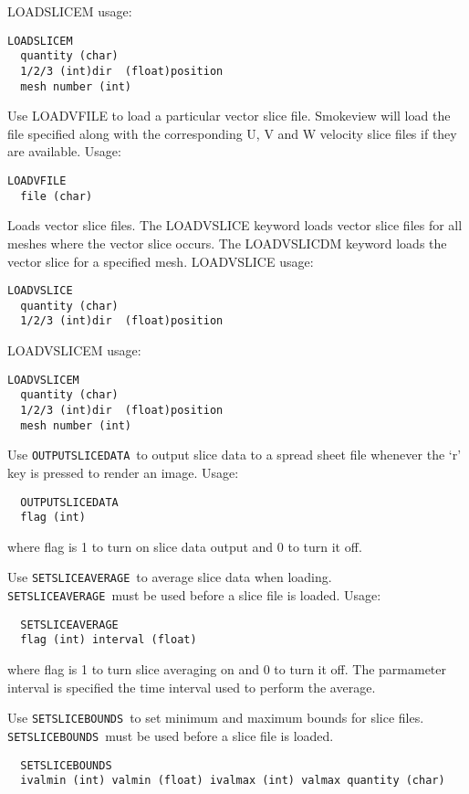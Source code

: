 \documentclass[11pt,twoside]{book}
\begin{document}
\noindent LOADSLICEM usage:
\begin{lstlisting}
LOADSLICEM
  quantity (char)
  1/2/3 (int)dir  (float)position
  mesh number (int)
\end{lstlisting}

Use LOADVFILE to load a particular vector slice file.  Smokeview will load the file
specified along with the corresponding U, V and W velocity slice files if they are available.
Usage:
\begin{lstlisting}
LOADVFILE
  file (char)
\end{lstlisting}

Loads vector slice files.  The LOADVSLICE keyword loads vector slice files for all meshes where the vector slice occurs.  The LOADVSLICDM keyword loads the vector slice for a specified mesh. LOADVSLICE usage:
\begin{lstlisting}
LOADVSLICE
  quantity (char)
  1/2/3 (int)dir  (float)position
\end{lstlisting}

\noindent LOADVSLICEM usage:
\begin{lstlisting}
LOADVSLICEM
  quantity (char)
  1/2/3 (int)dir  (float)position
  mesh number (int)
\end{lstlisting}

Use {\tt OUTPUTSLICEDATA}\ to output slice data to a spread
sheet file whenever the `r' key is pressed to render an image.
Usage:
\begin{lstlisting}
  OUTPUTSLICEDATA
  flag (int)
\end{lstlisting}

where flag is 1 to turn on slice data output and 0 to turn it off.

Use {\tt SETSLICEAVERAGE}\ to average slice data when loading.
{\tt SETSLICEAVERAGE}\ must be used before a slice
file is loaded. Usage:
\begin{lstlisting}
  SETSLICEAVERAGE
  flag (int) interval (float)
\end{lstlisting}

where flag is 1 to turn slice averaging on and 0 to turn it off.
The parmameter interval is specified the time interval used
to perform the average.

Use {\tt SETSLICEBOUNDS}\ to set minimum and maximum bounds for slice files.
{\tt SETSLICEBOUNDS}\ must be used before a slice
file is loaded.
\begin{lstlisting}
  SETSLICEBOUNDS
  ivalmin (int) valmin (float) ivalmax (int) valmax quantity (char)
\end{lstlisting}
\end{document}
